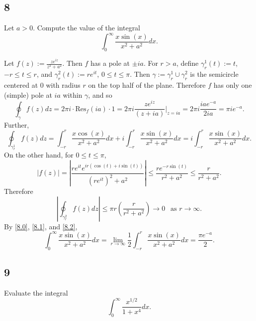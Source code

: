 \documentclass[12pt]{article}
\begin{document}
\subsection*{8}
\begin{tcolorbox}
Let $a > 0$. Compute the value of the integral
\[ \int_{0}^{\infty}\frac{x\sin(x)}{x^2 + a^2}dx. \]
\end{tcolorbox}
Let $f(z) := \frac{ze^{iz}}{z^{2} + a^{2}}$. Then $f$ has a pole at $\pm ia$. For $r > a$, define $\gamma_{r}^{1}(t) := t$, $-r \leq t \leq r$, and
$\gamma_{r}^{2}(t) := re^{it}$, $0 \leq t \leq \pi$. Then $\gamma := \gamma_{r}^{1} \cup \gamma_{r}^{2}$ is the semicircle centered at 0 with radius
$r$ on the top half of the plane. Therefore $f$ has only one (simple) pole at $ia$ within $\gamma$, and so
\begin{equation}
\oint_{\gamma}f(z)dz = 2\pi i \cdot \text{Res}_{f}(ia)\cdot 1 = 2\pi i \frac{ze^{iz}}{(z + ia)}\bigg|_{z=ia} = 2\pi i\frac{ia e^{-a}}{2ia} = \pi i
e^{-a}.
\label{8.0}
\end{equation}
Further,
\begin{equation}
\oint_{\gamma_{r}^{1}}f(z)dz = \int_{-r}^{r}\frac{x\cos(x)}{x^{2} + a^{2}}dx + i \int_{-r}^{r}\frac{x\sin(x)}{x^{2} + a^{2}}dx =
i\int_{-r}^{r}\frac{x\sin(x)}{x^{2} + a^{2}}dx.
\label{8.1}
\end{equation}
On the other hand, for $0 \leq t \leq \pi$,
\[ |f(z)| = \left|\frac{re^{it}e^{ir(\cos(t) + i\sin(t))}}{(re^{it})^{2} + a^{2}}\right| \leq \frac{re^{-r\sin(t)}}{r^{2} + a^{2}} \leq \frac{r}{r^{2}
+ a^{2}}. \]
Therefore
\begin{equation}
\left| \oint_{\gamma_{r}^{2}}f(z)dz \right| \leq \pi r\left( \frac{r}{r^{2} + a^{2}} \right) \rightarrow 0 \ \ \text{ as } r\rightarrow \infty.
\label{8.2}
\end{equation}
By \eqref{8.0}, \eqref{8.1}, and \eqref{8.2},
\[ \int_{0}^{\infty}\frac{x\sin(x)}{x^{2} + a^{2}}dx = \lim_{r\rightarrow\infty}\frac{1}{2}\int_{-r}^{r}\frac{x\sin(x)}{x^{2} + a^{2}}dx = \frac{\pi
e^{-a}}{2}. \]

\newpage
\subsection*{9}
\begin{tcolorbox}
Evaluate the integral
\[ \int_{0}^{\infty}\frac{x^{1/2}}{1 + x^{4}}dx. \]
\end{tcolorbox}



\newpage
\end{document}
